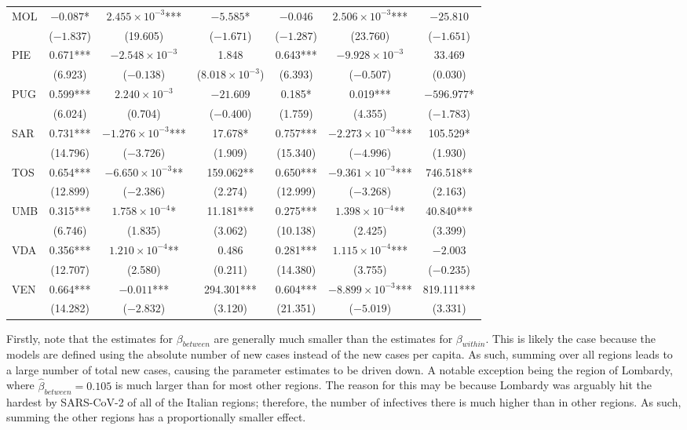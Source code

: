 \documentclass[12pt]{article}
\begin{document}
\begin{longtable}{@{}lcccccc@{}}
        MOL & $-0.087$* & $2.455 \times 10^{-3}$*** & $-5.585$* & $-0.046$ & $2.506 \times 10^{-3}$*** & $-25.810$ \\ 
         & ($-1.837$) & (19.605) & ($-1.671$) & ($-1.287$) & (23.760) & ($-1.651$) \\ 
        PIE & 0.671*** & $-2.548 \times 10^{-3}$ & 1.848 & 0.643*** & $-9.928 \times 10^{-3}$ & 33.469 \\ 
         & (6.923) & ($-0.138$) & ($8.018 \times 10^{-3}$) & (6.393) & ($-0.507$) & (0.030) \\ 
        PUG & 0.599*** & $2.240 \times 10^{-3}$ & $-21.609$ & 0.185* & 0.019*** & $-596.977$* \\ 
         & (6.024) & (0.704) & ($-0.400$) & (1.759) & (4.355) & ($-1.783$) \\ 
        SAR & 0.731*** & $-1.276 \times 10^{-3}$*** & 17.678* & 0.757*** & $-2.273 \times 10^{-3}$*** & 105.529* \\ 
         & (14.796) & ($-3.726$) & (1.909) & (15.340) & ($-4.996$) & (1.930) \\ 
        TOS & 0.654*** & $-6.650 \times 10^{-3}$** & 159.062** & 0.650*** & $-9.361 \times 10^{-3}$*** & 746.518** \\ 
         & (12.899) & ($-2.386$) & (2.274) & (12.999) & ($-3.268$) & (2.163) \\ 
        UMB & 0.315*** & $1.758 \times 10^{-4}$* & 11.181*** & 0.275*** & $1.398 \times 10^{-4}$** & 40.840*** \\ 
         & (6.746) & (1.835) & (3.062) & (10.138) & (2.425) & (3.399) \\ 
        VDA & 0.356*** & $1.210 \times 10^{-4}$** & 0.486 & 0.281*** & $1.115 \times 10^{-4}$*** & $-2.003$ \\ 
         & (12.707) & (2.580) & (0.211) & (14.380) & (3.755) & ($-0.235$) \\ 
        VEN & 0.664*** & $-0.011$*** & 294.301*** & 0.604*** & $-8.899 \times 10^{-3}$*** & 819.111*** \\ 
         & (14.282) & ($-2.832$) & (3.120) & (21.351) & ($-5.019$) & (3.331) \\* \bottomrule
	\end{longtable}
	
    Firstly, note that the estimates for $\beta_{between}$ are generally much smaller than the estimates for $\beta_{within}$. This is likely the case because the models are defined using the absolute number of new cases instead of the new cases per capita. As such, summing over all regions leads to a large number of total new cases, causing the parameter estimates to be driven down. A notable exception being the region of Lombardy, where $\widehat{\beta}_{between} = 0.105$ is much larger than for most other regions. The reason for this may be because Lombardy was arguably hit the hardest by SARS-CoV-2 of all of the Italian regions; therefore, the number of infectives there is much higher than in other regions. As such, summing the other regions has a proportionally smaller effect. \\
	
\end{document}
